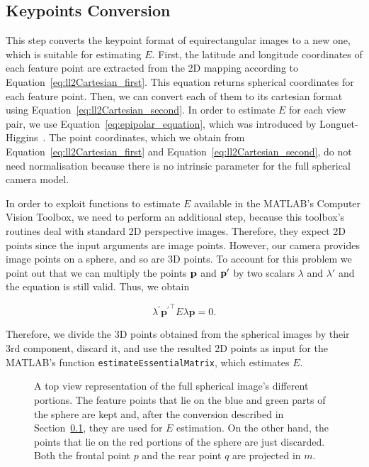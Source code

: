\subsection{Keypoints Conversion}
\label{sec:keypoints_conversion}
%
This step converts the keypoint format of equirectangular images to a new one, which is
suitable for estimating $E$.
%
First, the latitude and longitude coordinates of each feature point are 
extracted from the 2D mapping according to Equation~\ref{eq:ll2Cartesian_first}.
This equation returns spherical coordinates for each feature point. 
Then, we can convert each of them to its cartesian format using Equation~\ref{eq:ll2Cartesian_second}. 
%
In order to estimate $E$ for each view pair, we use Equation~\ref{eq:epipolar_equation}, which was
introduced by Longuet-Higgins~\cite{longuet1981computer}.
The point coordinates, which we obtain from Equation~\ref{eq:ll2Cartesian_first} and
Equation~\ref{eq:ll2Cartesian_second}, do not need normalisation because there
is no intrinsic parameter for the full spherical camera model.

In order to exploit functions to estimate $E$ available in the MATLAB's Computer Vision Toolbox, we need to perform an additional step, because this toolbox's routines deal with standard 2D perspective images. Therefore, they expect 
2D points since the input arguments are image points. However, our camera provides image points on a sphere, and so are 3D points. To account for this problem we point out that we can multiply the points $\mathbf{p}$ and $\mathbf{p}'$ by two 
scalars ${\lambda}$ and ${\lambda}'$ and the equation is still valid. Thus, we obtain

\begin{equation*}
\lambda^\prime{\mathbf{p}^\prime}^\top E\lambda\mathbf{p} = 0 \text{.}
\end{equation*}

Therefore, we divide the 3D points obtained from the spherical images by their 
3rd component, discard it, and use the resulted 2D points as input for the 
MATLAB's function {\tt estimateEssentialMatrix}, which estimates $E$.

\begin{figure}
    \centering
    \def\svgwidth{0.8\columnwidth}
    
    \caption{A top view representation of the full spherical image's 
    different portions.
    The feature points that lie on the blue and green parts of the sphere are kept and,
    after the conversion described in Section~\ref{sec:keypoints_conversion},
    they are used for $E$ estimation. On the other hand, the points that lie
    on the red portions of the sphere are just discarded.
    Both the frontal point $p$ and the rear point $q$ are projected in $m$.}
	\label{fig:sphere_division}
\end{figure}

